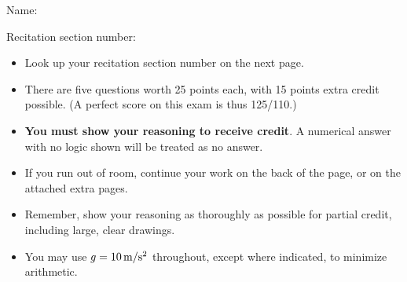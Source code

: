 \documentclass[12pt]{article}
\begin{document}
\bigskip
\bigskip
\bigskip
\bigskip

\Large \centerline{}

\vspace{2in}

\Large
\hspace{1in} Name: \underline{\hspace{3in}}

\bigskip
\bigskip

\hspace{1in} Recitation section number: \underline{\hspace{1.1in}}

\normalsize

\vspace{1.4in}

\begin{itemize}
  \item{Look up your recitation section number on the next page.}
  \item{There are five questions worth 25 points each, with 15 points extra credit possible. (A perfect score on this exam is thus 125/110.)}
  \item{{\bf You must show your reasoning to receive credit}. A numerical answer with no logic shown will be treated as no answer.}
  \item{If you run out of room, continue your work on the back of the page, or on the attached extra pages.}
  \item{Remember, show your reasoning as thoroughly as possible for partial credit, including large, clear drawings.}
  \item{You may use $g=10\, \rm m/\rm s^2$ throughout, except where indicated, to minimize arithmetic.}
\end{itemize}
\newpage
\end{document}
